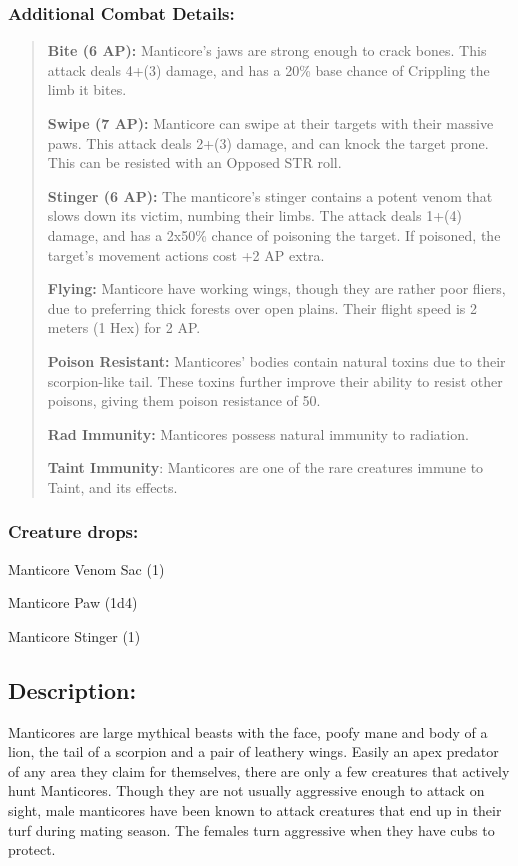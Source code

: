 \documentclass[11pt,a4paper,twocolumn]{book}
\begin{document}
	\subsubsection*{Additional Combat Details:}
	\begin{verse}
		\textbf{Bite (6 AP):} Manticore's jaws are strong enough to crack bones. This attack deals 4+(3) damage, and has a 20\% base chance of Crippling the limb it bites.
		
		\textbf{Swipe (7 AP):} Manticore can swipe at their targets with their massive paws. This attack deals 2+(3) damage, and can knock the target prone. This can be resisted with an Opposed STR roll.
		
		\textbf{Stinger (6 AP):} The manticore's stinger contains a potent venom that slows down its victim, numbing their limbs. The attack deals 1+(4) damage, and has a 2x50\% chance of poisoning the target. If poisoned, the target's movement actions cost +2 AP extra.
		
		\textbf{Flying:} Manticore have working wings, though they are rather poor fliers, due to preferring thick forests over open plains. Their flight speed is 2 meters (1 Hex) for 2 AP.
		
		\textbf{Poison Resistant:} Manticores' bodies contain natural toxins due to their scorpion-like tail. These toxins further improve their ability to resist other poisons, giving them poison resistance of 50.
		
		\textbf{Rad Immunity:} Manticores possess natural immunity to radiation.
		
		\textbf{Taint Immunity}: Manticores are one of the rare creatures immune to Taint, and its effects.
	\end{verse}
	
	\subsubsection*{Creature drops:}
	\begin{compactitem}
		\item Manticore Venom Sac (1)
		\item Manticore Paw (1d4)
		\item Manticore Stinger (1)
	\end{compactitem}
	
	\subsection*{Description:}
	Manticores are large mythical beasts with the face, poofy mane and body of a lion, the tail of a scorpion and a pair of leathery wings. Easily an apex predator of any area they claim for themselves, there are only a few creatures that actively hunt Manticores. Though they are not usually aggressive enough to attack on sight, male manticores have been known to attack creatures that end up in their turf during mating season. The females turn aggressive when they have cubs to protect.
	
\end{document}
